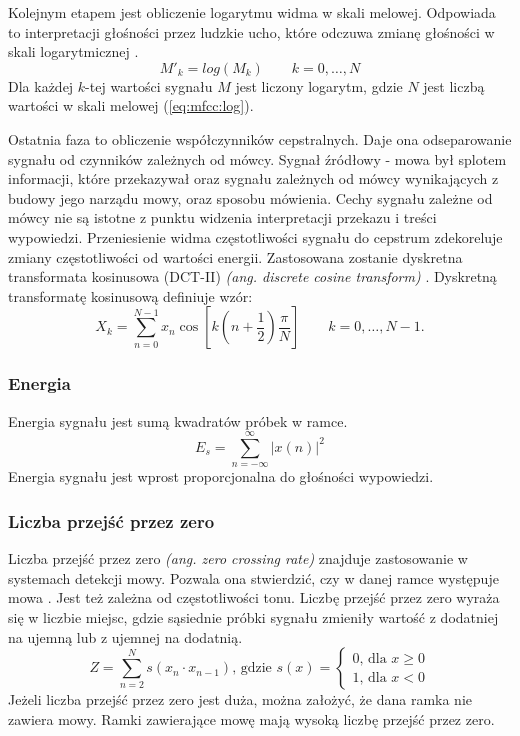 \documentclass[a4paper,12pt,twoside,openany]{report}
\newcommand{\ang}[1]{\textit{(ang. #1)}}
\newcommand{\Eq}[1]{(\ref{#1})}
\begin{document}
Kolejnym etapem jest obliczenie logarytmu widma w skali melowej.
Odpowiada to interpretacji głośności przez ludzkie ucho,
które odczuwa zmianę głośności w skali logarytmicznej \cite{Hossan2013}.
\begin{equation}
	M'_k=log(M_k)\qquad k=0, \dots, N
	\label{eq:mfcc:log}
\end{equation}
Dla każdej $k$-tej wartości sygnału $M$ jest liczony logarytm, gdzie $N$ jest liczbą wartości w skali melowej \Eq{eq:mfcc:log}.

Ostatnia faza to obliczenie współczynników cepstralnych.
Daje ona odseparowanie sygnału od czynników zależnych od mówcy.
Sygnał źródłowy - mowa był splotem informacji,
które przekazywał oraz sygnału zależnych od mówcy wynikających z budowy jego narządu mowy, oraz sposobu mówienia.
Cechy sygnału zależne od mówcy nie są istotne z punktu widzenia interpretacji przekazu i treści wypowiedzi.
Przeniesienie widma częstotliwości sygnału do cepstrum zdekoreluje zmiany częstotliwości od wartości energii.
Zastosowana zostanie dyskretna transformata kosinusowa (DCT-II) \ang{discrete cosine transform} \cite{Hossan2013}.
Dyskretną transformatę kosinusową definiuje wzór:
\begin{equation}
	X_k =
	 \sum_{n=0}^{N-1} x_n \cos \left[k \left(n+\frac{1}{2}\right) \frac{\pi}{N} \right] \quad \quad k = 0, \dots, N-1.
\end{equation}


\subsubsection{Energia}
Energia sygnału jest sumą kwadratów próbek w ramce.
\begin{equation}
	E_{s}=\sum _{n=-\infty }^{\infty }{|x(n)|^{2}}
	\label{eq:energy}
\end{equation}
Energia sygnału jest wprost proporcjonalna do głośności wypowiedzi.
\subsubsection{Liczba przejść przez zero}
Liczba przejść przez zero \ang{zero crossing rate} znajduje zastosowanie w systemach detekcji mowy.
Pozwala ona stwierdzić, czy w danej ramce występuje mowa \cite{Walters-Williams2010}.
Jest też zależna od częstotliwości tonu. 
Liczbę przejść przez zero wyraża się w liczbie miejsc, gdzie sąsiednie próbki sygnału zmieniły wartość z dodatniej na ujemną lub z ujemnej na dodatnią.
\begin{equation}
	Z = \sum_{n=2}^{N}s(x_n \cdot x_{n-1})\text{, gdzie } s(x) = 
	\begin{cases} 
		0 \text{, dla } x \geq 0 \\
		1 \text{, dla } x < 0
	\end{cases}
	\label{eq:zcr}
\end{equation}
Jeżeli liczba przejść przez zero jest duża, można założyć, że dana ramka nie zawiera mowy.
Ramki zawierające mowę mają wysoką liczbę przejść przez zero.
\end{document}
